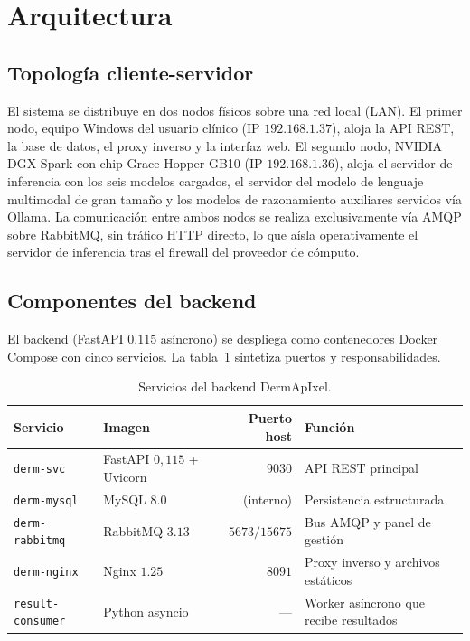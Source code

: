 \section{Arquitectura}
\label{sec:dermapixel-arq}

\subsection{Topología cliente-servidor}
\label{sec:dermapixel-topologia}

El sistema se distribuye en dos nodos físicos sobre una red local
(LAN). El primer nodo, equipo Windows del usuario clínico
(IP $192.168.1.37$), aloja la API REST, la base de datos, el
proxy inverso y la interfaz web. El segundo nodo, NVIDIA DGX Spark
con chip Grace Hopper GB10 (IP $192.168.1.36$), aloja el
servidor de inferencia con los seis modelos cargados, el
servidor del modelo de lenguaje multimodal de gran tamaño y los
modelos de razonamiento auxiliares servidos vía Ollama. La
comunicación entre ambos nodos se realiza exclusivamente vía AMQP
sobre RabbitMQ, sin tráfico HTTP directo, lo que aísla
operativamente el servidor de inferencia tras el firewall del
proveedor de cómputo.

\subsection{Componentes del backend}
\label{sec:dermapixel-backend}

El backend (FastAPI $0.115$ asíncrono) se despliega como
contenedores Docker Compose con cinco servicios. La
tabla~\ref{tab:dermapixel-services} sintetiza puertos y
responsabilidades.

\begin{table}[H]
\centering
\footnotesize
\setlength{\tabcolsep}{4pt}
\renewcommand{\arraystretch}{0.95}
\caption{Servicios del backend DermApIxel.}
\label{tab:dermapixel-services}
\begin{tabular}{llrl}
\hline
Servicio                & Imagen               & Puerto host & Función \\
\hline
\texttt{derm-svc}       & FastAPI $0{,}115$ + Uvicorn  & $9030$ & API REST principal \\
\texttt{derm-mysql}     & MySQL $8.0$          & (interno) & Persistencia estructurada \\
\texttt{derm-rabbitmq}  & RabbitMQ $3.13$      & $5673 / 15675$ & Bus AMQP y panel de gestión \\
\texttt{derm-nginx}     & Nginx $1.25$         & $8091$ & Proxy inverso y archivos estáticos \\
\texttt{result-consumer}& Python asyncio       & ---          & Worker asíncrono que recibe resultados \\
\hline
\end{tabular}
\end{table}

